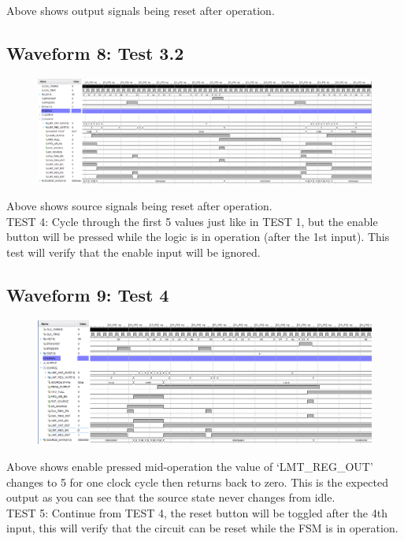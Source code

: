 \documentclass[11pt]{report}
\begin{document}
Above shows output signals being reset after operation.

\subsection*{Waveform 8: Test 3.2 }
\begin{figure}[H]
       \includegraphics[width=\columnwidth]{Assets/Test3_2.png}
\end{figure}

Above shows source signals being reset after operation.\\

TEST 4: Cycle through the first 5 values just like in TEST 1, but the enable button will be pressed while the logic is in
operation (after the 1st input). This test will verify that the enable input will be ignored.

\subsection*{Waveform 9: Test 4 }
\begin{figure}[H]
       \includegraphics[width=\columnwidth]{Assets/Test4.png}
\end{figure}

Above shows enable pressed mid-operation the value of `LMT\_REG\_OUT' changes to 5 for one clock cycle then returns back to zero. 
This is the expected output as you can see that the source state never changes from idle.\\ 

TEST 5: Continue from TEST 4, the reset button will be toggled after the 4th input, this will verify that the circuit can be reset
while the FSM is in operation.
\end{document}
